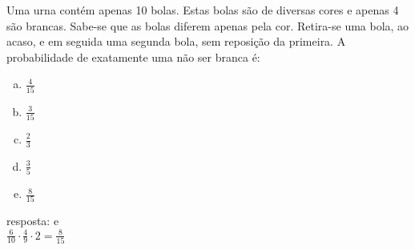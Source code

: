 \begin{ex}
 Uma urna contém apenas 10 bolas. Estas bolas são de diversas cores e apenas 4 são brancas. Sabe-se que as bolas diferem apenas pela cor. Retira-se uma bola, ao acaso, e em seguida uma segunda bola, sem reposição da primeira. A probabilidade de exatamente uma não ser branca é:
    \begin{enumerate}[(a)]
    \item $\frac{4}{15}$
    \item $\frac{3}{15}$
    \item $\frac{2}{3}$
    \item $\frac{3}{5}$
    \item $\frac{8}{15}$
    \end{enumerate}
      \begin{sol}
       resposta: e \\
       $\frac{6}{10}\cdot\frac{4}{9}\cdot2=\frac{8}{15}$
      \end{sol}
\end{ex}